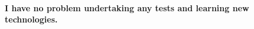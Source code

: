 \documentclass[11pt, a4paper]{awesome-cv} %
\begin{document}
\makecvheader %
\vspace{-0.5cm}
\paragraph{I have no problem undertaking any tests and learning new technologies.\\}

\bigskip
\noindent







%
%





\end{document}
